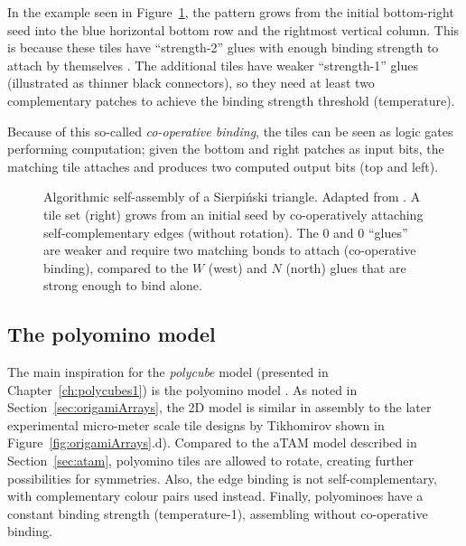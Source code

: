 In the example seen in Figure~\ref{fig:atam}, the pattern grows from the initial bottom-right seed into the blue horizontal bottom row and the rightmost vertical column. This is because these tiles have ``strength-2'' glues with enough binding strength to attach by themselves \cite{doty2012theory}. The additional tiles have weaker ``strength-1'' glues (illustrated as thinner black connectors), so they need at least two complementary patches to achieve the binding strength threshold (temperature).

Because of this so-called \emph{co-operative binding}, the tiles can be seen as logic gates performing computation; given the bottom and right patches as input bits, the matching tile attaches and produces two computed output bits (top and left).



\begin{figure}[h]
  \centering
  \caption{Algorithmic self-assembly of a Sierpiński triangle. Adapted from \cite{doty2017}. A tile set (right) grows from an initial seed by co-operatively attaching self-complementary edges (without rotation). The \(0\) and \(0\) ``glues'' are weaker and require two matching bonds to attach (co-operative binding), compared to the \(W\) (west) and \(N\) (north) glues that are strong enough to bind alone.}
  \label{fig:atam}
\end{figure}

\subsection{The polyomino model}\label{sec:polyomino}

The main inspiration for the \emph{polycube} model (presented in Chapter~\ref{ch:polycubes1}) is the polyomino model \cite{ahnert2010self, johnston2011evolutionary}. As noted in Section~\ref{sec:origamiArrays}, the 2D model is similar in assembly to the later experimental micro-meter scale tile designs by Tikhomirov \cite{tikhomirov2017programmable} shown in Figure~\ref{fig:origamiArrays}.d). Compared to the aTAM model described in Section~\ref{sec:atam}, polyomino tiles are allowed to rotate, creating further possibilities for symmetries. Also, the edge binding is not self-complementary, with complementary colour pairs used instead. Finally, polyominoes have a constant binding strength (temperature-1), assembling without co-operative binding.

